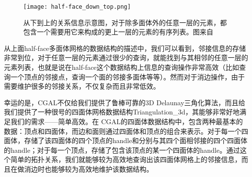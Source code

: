 \begin{figure}[htbp]
    \centering
    \texttt{[image: half-face\_down\_top.png]}
    \caption{从下到上的关系信息示意图，对于除多面体外的任意一层的元素，都包含一个需要用它来构成的更上一层的元素的有序列表。图来自\cite{open-volume-mesh}}
    \label{fig:half-face-down-top}
\end{figure}
从上面half-face多面体网格的数据结构的描述中，我们可以看到，邻接信息的存储非常到位，对于任意一层的元素通过很少的查询，就能找到与其相邻的任意一层的元素列表，也就是说在half-face这个数据结构上信息的查询操作非常高效（比如查询一个顶点的邻接点，查询一个面的邻接多面体等等）。然而对于消边操作，由于需要维护很多的邻接关系，不仅复杂而且非常低效。\par
幸运的是，CGAL不仅给我们提供了鲁棒可靠的3D Delaunay三角化算法，而且给我们提供了一种很号的四面体网格数据结构Triangulation\_3d，其能够非常好地满足我们的需求——简单高效。在 CGAL的四面体数据结构中，包含两种最基本的数据：顶点和四面体，而边和面则通过四面体和顶点的组合来表示。对于每一个四面体，存储了该四面体的四个顶点的handle和分别与其四个面相邻接的四个四面体的handle；对于每一个顶点，存储了包含该顶点的某一个四面体的handle。通过这个简单的拓扑关系，我们就能够较为高效地查询出该四面体网格上的邻接信息，而且在做消边时也能够较为高效地维护该数据结构。


